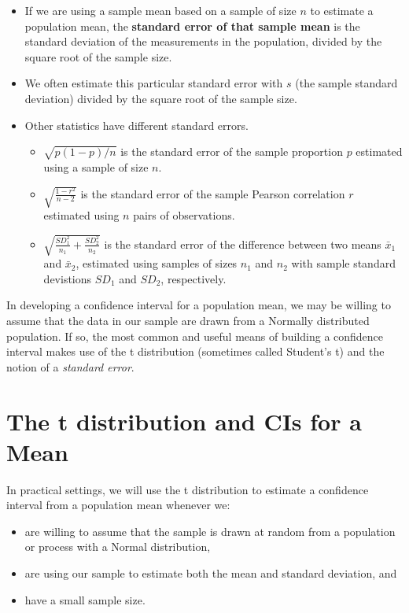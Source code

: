 \documentclass[
]{book}
\providecommand{\tightlist}{%
  \setlength{\itemsep}{0pt}\setlength{\parskip}{0pt}}
\begin{document}
\begin{itemize}
\item
  If we are using a sample mean based on a sample of size \(n\) to estimate a population mean, the \textbf{standard error of that sample mean} is the standard deviation of the measurements in the population, divided by the square root of the sample size.
\item
  We often estimate this particular standard error with \(s\) (the sample standard deviation) divided by the square root of the sample size.
\item
  Other statistics have different standard errors.

  \begin{itemize}
  \tightlist
  \item
    \(\sqrt{p (1-p) / n}\) is the standard error of the sample proportion \(p\) estimated using a sample of size \(n\).
  \item
    \(\sqrt{\frac{1-r^2}{n-2}}\) is the standard error of the sample Pearson correlation \(r\) estimated using \(n\) pairs of observations.
  \item
    \(\sqrt{\frac{SD_1^2}{n_1} + \frac{SD_2^2}{n_2}}\) is the standard error of the difference between two means \(\bar{x}_1\) and \(\bar{x}_2\), estimated using samples of sizes \(n_1\) and \(n_2\) with sample standard devistions \(SD_1\) and \(SD_2\), respectively.
  \end{itemize}
\end{itemize}

In developing a confidence interval for a population mean, we may be willing to assume that the data in our sample are drawn from a Normally distributed population. If so, the most common and useful means of building a confidence interval makes use of the t distribution (sometimes called Student's t) and the notion of a \emph{standard error}.

\hypertarget{the-t-distribution-and-cis-for-a-mean}{%
\section{The t distribution and CIs for a Mean}\label{the-t-distribution-and-cis-for-a-mean}}

In practical settings, we will use the t distribution to estimate a confidence interval from a population mean whenever we:

\begin{itemize}
\tightlist
\item
  are willing to assume that the sample is drawn at random from a population or process with a Normal distribution,
\item
  are using our sample to estimate both the mean and standard deviation, and
\item
  have a small sample size.
\end{itemize}
\end{document}
